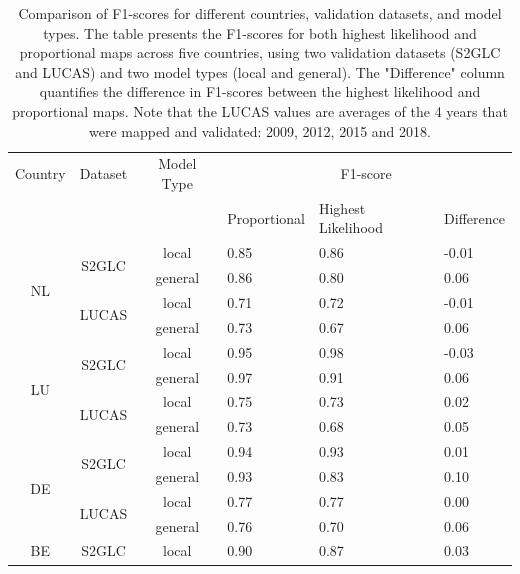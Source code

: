     \begin{table}[H]
    \caption{Comparison of F1-scores for different countries, validation datasets, and model types. The table presents the F1-scores for both highest likelihood and proportional maps across five countries, using two validation datasets (S2GLC and LUCAS) and two model types (local and general). The "Difference" column quantifies the difference in F1-scores between the highest likelihood and proportional maps. Note that the LUCAS values are averages of the 4 years that were mapped and validated: 2009, 2012, 2015 and 2018.}
    \centering
    \label{tab:f1_scores}
    \begin{tabular}{c|c|c|p{2.1cm}|p{2.12cm}|p{2cm}}
    Country & Dataset & Model Type & \multicolumn{3}{c}{F1-score} \\
    \cline{4-6}
           &         &            & Proportional & Highest Likelihood & Difference \\
    \hline
    \multirow{4}{*}{NL} & \multirow{2}{*}{S2GLC} & local & 0.85 & 0.86 & -0.01 \\
                        &                        & general & 0.86 & 0.80 & 0.06 \\
                        & \multirow{2}{*}{LUCAS} & local & 0.71 & 0.72 & -0.01 \\
                        &                        & general & 0.73 & 0.67 & 0.06 \\
    \hline
    \multirow{4}{*}{LU} & \multirow{2}{*}{S2GLC} & local & 0.95 & 0.98 & -0.03 \\
                        &                        & general & 0.97 & 0.91 & 0.06 \\
                        & \multirow{2}{*}{LUCAS} & local & 0.75 & 0.73 & 0.02 \\
                        &                        & general & 0.73 & 0.68 & 0.05 \\
    \hline
    \multirow{4}{*}{DE} & \multirow{2}{*}{S2GLC} & local & 0.94 & 0.93 & 0.01 \\
                        &                        & general & 0.93 & 0.83 & 0.10 \\
                        & \multirow{2}{*}{LUCAS} & local & 0.77 & 0.77 & 0.00 \\
                        &                        & general & 0.76 & 0.70 & 0.06 \\
    \hline
    \multirow{4}{*}{BE} & \multirow{2}{*}{S2GLC} & local & 0.90 & 0.87 & 0.03 \\

\end{tabular}
\end{table}
